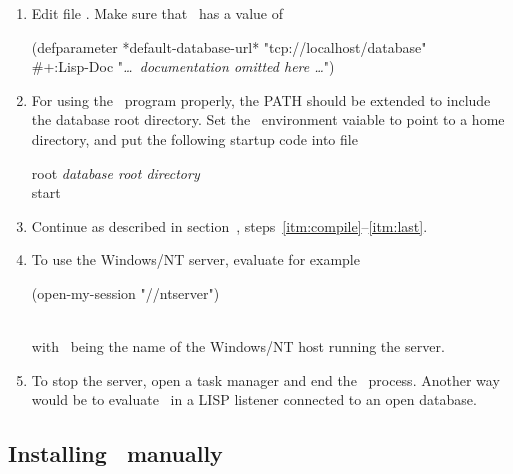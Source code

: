 \begin{enumerate}
\item Edit file . Make sure that
  \ has a value of
  \\[\smallskipamount]
\begin{tt}\CodeSize
(defparameter *default-database-url* "tcp://localhost/database"\\
\hspace*{2em}\#+:Lisp-Doc "\textrm{\emph{\ldots\ documentation omitted here \ldots}}")
\end{tt}

\item For using the \ program properly, the PATH
  should be extended to include the database root directory. Set the
  \ environment vaiable to point to a home directory, and
  put the following startup code into file
  \\[\smallskipamount]
  \begin{tt}\CodeSize
    root \textrm{\emph{\lt{}database root directory\gt{}}}\\
    start
  \end{tt}

\item Continue as described in section~,
  steps~\ref{itm:compile}--\ref{itm:last}.

\item To use the Windows/NT server, evaluate for example\\[\smallskipamount]
\begin{tt}\CodeSize
(open-my-session "//ntserver")
\end{tt}\\[\smallskipamount]
with \ being the name of the Windows/NT host running
the server.

\item To stop the server, open a task manager and end the
  \ process. Another way would be to evaluate
  \ in a LISP listener connected to an open database.

\end{enumerate}

\subsection[Installing PLOB manually]%
{Installing \protect\plob\ manually}\label{sec:ManualInstallation}

